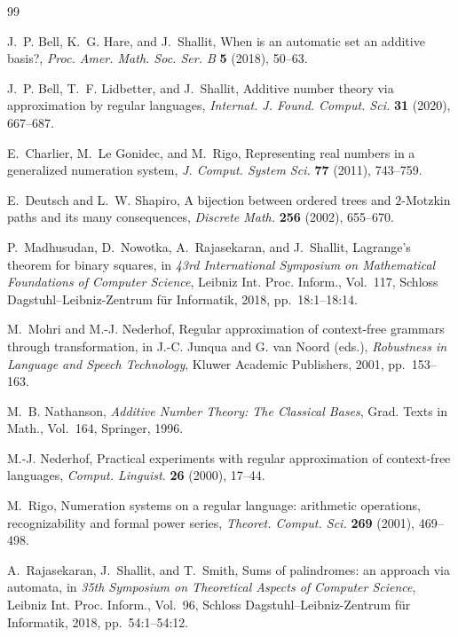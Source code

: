 \documentclass{ws-ijfcs}
\begin{document}
\begin{thebibliography}{99}

J.~P. Bell, K.~G. Hare, and J.~Shallit,
When is an automatic set an additive basis?,
\emph{Proc. Amer. Math. Soc. Ser. B} \textbf{5} (2018), 50--63.

J.~P. Bell, T.~F. Lidbetter, and J.~Shallit,
Additive number theory via approximation by regular languages,
\emph{Internat. J. Found. Comput. Sci.} \textbf{31} (2020), 667--687.

E.~Charlier, M.~Le Gonidec, and M.~Rigo,
Representing real numbers in a generalized numeration system,
\emph{J. Comput. System Sci.} \textbf{77} (2011), 743--759.

E.~Deutsch and L.~W. Shapiro,
A bijection between ordered trees and $2$-Motzkin paths and its many
consequences,
\emph{Discrete Math.} \textbf{256} (2002), 655--670.

P.~Madhusudan, D.~Nowotka, A.~Rajasekaran, and J.~Shallit,
Lagrange's theorem for binary squares,
in \emph{43rd International Symposium on Mathematical Foundations of
Computer Science}, Leibniz Int. Proc. Inform., Vol.~117, Schloss
Dagstuhl--Leibniz-Zentrum f{\"u}r Informatik, 2018, pp.~18:1--18:14.

M.~Mohri and M.-J. Nederhof,
Regular approximation of context-free grammars through transformation,
in J.-C. Junqua and G. van Noord (eds.),
\emph{Robustness in Language and Speech Technology},
Kluwer Academic Publishers, 2001, pp.~153--163.

M.~B. Nathanson,
\emph{Additive Number Theory: The Classical Bases},
Grad. Texts in Math., Vol.~164, Springer, 1996.

M.-J. Nederhof,
Practical experiments with regular approximation of context-free
languages,
\emph{Comput. Linguist.} \textbf{26} (2000), 17--44.

M.~Rigo,
Numeration systems on a regular language: arithmetic operations,
recognizability and formal power series,
\emph{Theoret. Comput. Sci.} \textbf{269} (2001), 469--498.

A.~Rajasekaran, J.~Shallit, and T.~Smith,
Sums of palindromes: an approach via automata,
in \emph{35th Symposium on Theoretical Aspects of Computer Science},
Leibniz Int. Proc. Inform., Vol.~96, Schloss
Dagstuhl--Leibniz-Zentrum f{\"u}r Informatik, 2018, pp.~54:1--54:12.

\end{thebibliography}
\end{document}

